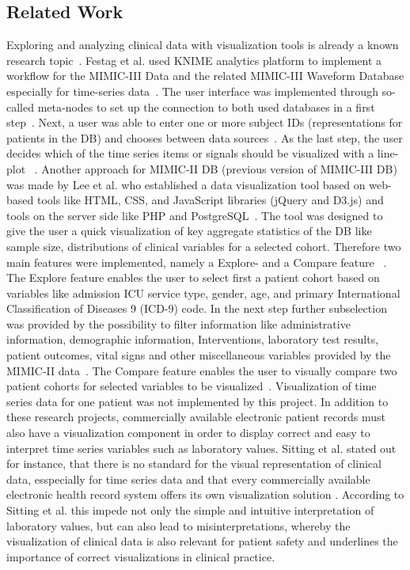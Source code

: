 \documentclass[aac]{iosart2x}
\begin{document}
\subsection{Related Work}
Exploring and analyzing clinical data with visualization tools is already a known research topic~\cite{Caban.2015, Sittig.2015, UnberathPhilipp.2019, Festag.2019}. Festag et al. used KNIME analytics platform to implement a workflow for the MIMIC-III Data and the related MIMIC-III Waveform Database especially for time-series data~\cite{Festag.2019}. The user interface was implemented through so-called meta-nodes to set up the connection to both used databases in a first step~\cite{Festag.2019}. Next, a user was able to enter one or more subject IDs (representations for patients in the DB) and chooses between data sources~\cite{Festag.2019}. As the last step, the user decides which of the time series items or signals should be visualized with a line-plot ~\cite{Festag.2019}.
Another approach for MIMIC-II DB (previous version of MIMIC-III DB) was made by Lee et al. who established a data visualization tool based on web-based tools like HTML, CSS, and JavaScript libraries (jQuery and D3.js) and tools on the server side like PHP and PostgreSQL~\cite{Lee.2016}. The tool was designed to give the user a quick visualization of key aggregate statistics of the DB like sample size, distributions of clinical variables for a selected cohort. Therefore two main features were implemented, namely a Explore- and a Compare feature ~\cite{Lee.2016}. The Explore feature enables the user to select first a patient cohort based on variables like admission ICU service type, gender, age, and primary International Classification of Diseases 9 (ICD-9) code. In the next step further subselection was provided by the possibility to filter information like administrative information, demographic information, Interventions, laboratory test results, patient outcomes, vital signs and other miscellaneous variables provided by the MIMIC-II data~\cite{Lee.2016}. The Compare feature enables the user to visually compare two patient cohorts for
selected variables to be visualized~\cite{Lee.2016}. Visualization of time series data for one patient was not implemented by this project. In addition to these research projects, commercially available electronic patient records must also have a visualization component in order to display correct and easy to interpret time series variables such as laboratory values. Sitting et al. stated out for instance, that there is no standard for the visual representation of clinical data, esspecially for time series data and that every commercially available electronic health record system offers its own visualization solution \cite{Sittig.2015}. According to Sitting et al. this impede not only the simple and intuitive interpretation of laboratory values, but can also lead to misinterpretations, whereby the visualization of clinical data is also relevant for patient safety and underlines the importance of correct visualizations in clinical practice.
\end{document}
